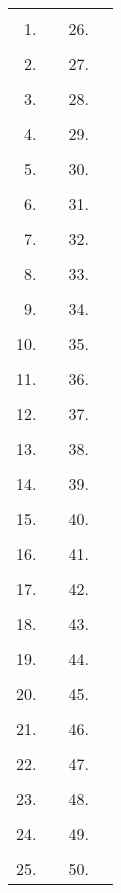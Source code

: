 \begin{tabularx}{\textwidth}{|r X|r X|}
\hline
& & & \\[-1.3em]  1. & & 26. & \\[.1em] \hline
& & & \\[-1.3em]  2. & & 27. & \\[.1em] \hline
& & & \\[-1.3em]  3. & & 28. & \\[.1em] \hline
& & & \\[-1.3em]  4. & & 29. & \\[.1em] \hline
& & & \\[-1.3em]  5. & & 30. & \\[.1em] \hline
& & & \\[-1.3em]  6. & & 31. & \\[.1em] \hline
& & & \\[-1.3em]  7. & & 32. & \\[.1em] \hline
& & & \\[-1.3em]  8. & & 33. & \\[.1em] \hline
& & & \\[-1.3em]  9. & & 34. & \\[.1em] \hline
& & & \\[-1.3em] 10. & & 35. & \\[.1em] \hline
& & & \\[-1.3em] 11. & & 36. & \\[.1em] \hline
& & & \\[-1.3em] 12. & & 37. & \\[.1em] \hline
& & & \\[-1.3em] 13. & & 38. & \\[.1em] \hline
& & & \\[-1.3em] 14. & & 39. & \\[.1em] \hline
& & & \\[-1.3em] 15. & & 40. & \\[.1em] \hline
& & & \\[-1.3em] 16. & & 41. & \\[.1em] \hline
& & & \\[-1.3em] 17. & & 42. & \\[.1em] \hline
& & & \\[-1.3em] 18. & & 43. & \\[.1em] \hline
& & & \\[-1.3em] 19. & & 44. & \\[.1em] \hline
& & & \\[-1.3em] 20. & & 45. & \\[.1em] \hline
& & & \\[-1.3em] 21. & & 46. & \\[.1em] \hline
& & & \\[-1.3em] 22. & & 47. & \\[.1em] \hline
& & & \\[-1.3em] 23. & & 48. & \\[.1em] \hline
& & & \\[-1.3em] 24. & & 49. & \\[.1em] \hline
& & & \\[-1.3em] 25. & & 50. & \\[.1em] \hline
\end{tabularx}
